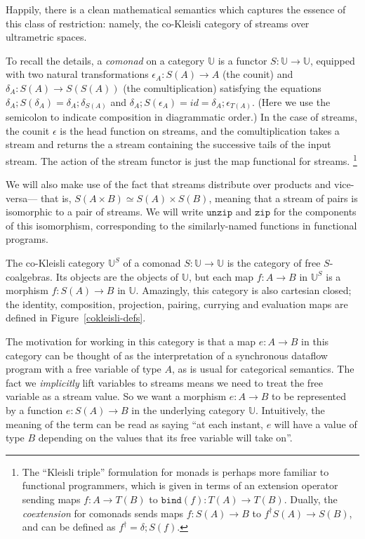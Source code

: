 \documentclass[preprint]{sigplanconf}
\newcommand{\ultrametric}{\mathbb{U}}
\newcommand{\term}[1]{\ensuremath{\mathtt{{#1}}}}
\newcommand{\counit}{\epsilon}
\newcommand{\tails}{\delta}
\begin{document}
Happily, there is a clean mathematical semantics which captures the
essence of this class of restriction: namely, the co-Kleisli category
of streams over ultrametric spaces. 

To recall the details, a \emph{comonad} on a category $\ultrametric$
is a functor $S : \ultrametric \to \ultrametric$, equipped with two
natural transformations $\counit_A : S(A) \to A$ (the counit) and
$\tails_A : S(A) \to S(S(A))$ (the comultiplication) satisfying the
equations $\tails_A; S(\tails_A) = \tails_A; \tails_{S(A)}$ and
$\tails_A; S(\counit_A) = id = \tails_A; \counit_{T(A)}$.  (Here we
use the semicolon to indicate composition in diagrammatic order.)  In
the case of streams, the counit $\counit$ is the head function on
streams, and the comultiplication takes a stream and returns the a
stream containing the successive tails of the input stream. The action
of the stream functor is just the map functional for streams.
\footnote{The ``Kleisli triple'' formulation for monads is perhaps
  more familiar to functional programmers, which is given in terms of
  an extension operator sending maps $f : A \to T(B)$ to $\term{bind}(f)  : T(A) \to
  T(B)$.  Dually, the \emph{coextension} for comonads sends maps $f :
  S(A) \to B$ to $f^\dagger S(A) \to S(B)$, and can be defined as
  $f^\dagger = \delta; S(f)$.}

We will also make use of the fact that streams distribute over
products and vice-versa--- that is, $S(A \times B) \simeq S(A) \times
S(B)$, meaning that a stream of pairs is isomorphic to a pair of
streams. We will write \term{unzip} and \term{zip} for the components
of this isomorphism, corresponding to the similarly-named functions in
functional programs.

The co-Kleisli category $\ultrametric^S$ of a comonad $S : \ultrametric
\to \ultrametric$ is the category of free $S$-coalgebras. Its objects
are the objects of $\ultrametric$, but each map $f : A \to B$ in
$\ultrametric^S$ is a morphism $f : S(A) \to B$ in
$\ultrametric$. Amazingly, this category is also cartesian closed; the
identity, composition, projection, pairing, currying and evaluation
maps are defined in Figure~\ref{cokleisli-defs}.

The motivation for working in this category is that a map $e : A \to
B$ in this category can be thought of as the interpretation of a
synchronous dataflow program with a free variable of type $A$, as is
usual for categorical semantics. The fact we \emph{implicitly} lift
variables to streams means we need to treat the free variable as a
stream value. So we want a morphism $e : A \to B$ to be represented
by a function $e : S(A) \to B$ in the underlying category $\ultrametric$. 
Intuitively, the meaning of the term can be read as saying ``at each
instant, $e$ will have a value of type $B$ depending on the values
that its free variable will take on''.
\end{document}

